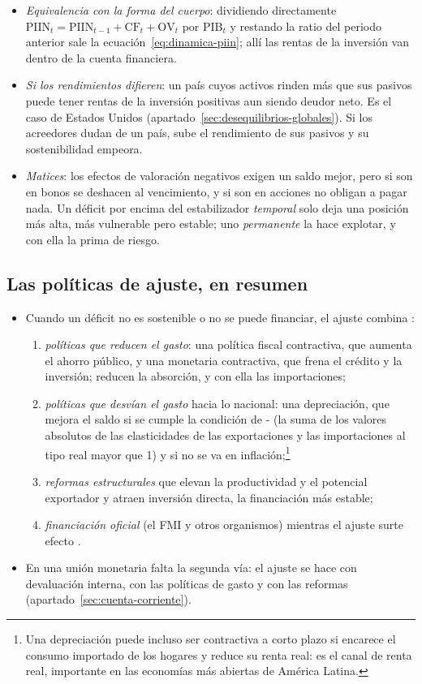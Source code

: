 \documentclass[11pt]{article}
\begin{document}
\begin{itemize}
\item \emph{Equivalencia con la forma del cuerpo}: dividiendo directamente $\mathrm{PIIN}_t=\mathrm{PIIN}_{t-1}+\mathrm{CF}_t+\mathrm{OV}_t$ por $\mathrm{PIB}_t$ y restando la ratio del periodo anterior sale la ecuación~\eqref{eq:dinamica-piin}; allí las rentas de la inversión van dentro de la cuenta financiera.
\item \emph{Si los rendimientos difieren}: un país cuyos activos rinden más que sus pasivos puede tener rentas de la inversión positivas aun siendo deudor neto. Es el caso de Estados Unidos (apartado~\ref{sec:desequilibrios-globales}). Si los acreedores dudan de un país, sube el rendimiento de sus pasivos y su sostenibilidad empeora.
\item \emph{Matices}: los efectos de valoración negativos exigen un saldo mejor, pero si son en bonos se deshacen al vencimiento, y si son en acciones no obligan a pagar nada. Un déficit por encima del estabilizador \emph{temporal} solo deja una posición más alta, más vulnerable pero estable; uno \emph{permanente} la hace explotar, y con ella la prima de riesgo.
\end{itemize}

\subsection*{Las políticas de ajuste, en resumen}

\begin{itemize}
\item Cuando un déficit no es sostenible o no se puede financiar, el ajuste combina :
  \begin{enumerate}
  \item \emph{políticas que reducen el gasto}: una política fiscal contractiva, que aumenta el ahorro público, y una monetaria contractiva, que frena el crédito y la inversión; reducen la absorción, y con ella las importaciones;
  \item \emph{políticas que desvían el gasto} hacia lo nacional: una depreciación, que mejora el saldo si se cumple la condición de - (la suma de los valores absolutos de las elasticidades de las exportaciones y las importaciones al tipo real mayor que 1) y si no se va en inflación;\footnote{Una depreciación puede incluso ser contractiva a corto plazo si encarece el consumo importado de los hogares y reduce su renta real: es el canal de renta real, importante en las economías más abiertas de América Latina\nocite{CamposPazLuque2023}.}
  \item \emph{reformas estructurales} que elevan la productividad y el potencial exportador y atraen inversión directa, la financiación más estable;
  \item \emph{financiación oficial} (el FMI y otros organismos) mientras el ajuste surte efecto .
  \end{enumerate}
\item En una unión monetaria falta la segunda vía: el ajuste se hace con devaluación interna, con las políticas de gasto y con las reformas (apartado~\ref{sec:cuenta-corriente}).
\end{itemize}
\end{document}
